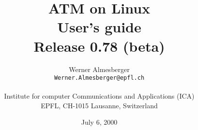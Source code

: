 

\documentclass[a4paper,11pt]{article}
\usepackage{url}

\def\meta#1{{\it #1\/}} %
\def\path#1{{\tt #1}}   %
\def\raw#1{{\tt #1}}    %
\def\craw#1{{\tt #1}}   %
\def\name#1{{\sf #1}}   %


\newenvironment{command}{\def\[{$\bigl[$}\def\]{$\bigr]$}\def\|{$\big\vert$}%
  \parindent=-2em\advance\leftskip by -\parindent\vskip -\parskip~\par
  \begingroup\tt\textfont0=\font}{%
  ~\endgroup\par~\advance\hoffset by \parindent}

\parindent=0pt
\parskip=4pt

\title{ATM on Linux \\
  User's guide \\
  Release 0.78 (beta)}
\author{Werner Almesberger \\
  {\tt Werner.Almesberger@epfl.ch} \\
  \\
  Institute for computer Communications and Applications (ICA) \\
  EPFL, CH-1015 Lausanne, Switzerland}
 
\date{July 6, 2000}


\maketitle
{
  \parskip=-1pt
  \setcounter{tocdepth}{2}
  \tableofcontents
}

